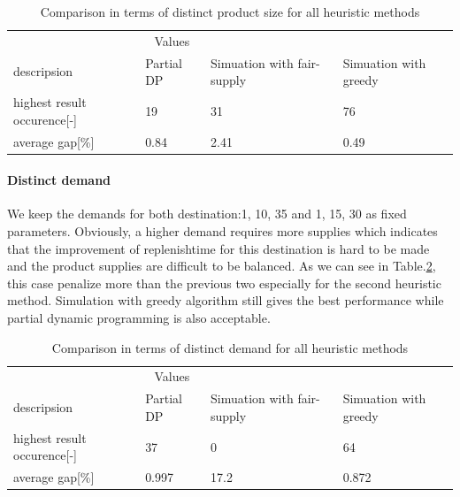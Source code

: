 \documentclass{article}
\begin{document}
\begin{table}[ht]
 \caption{Comparison in terms of distinct product size for all heuristic methods}
  \centering
  \begin{tabular}{llll}
    \toprule
    \multicolumn{3}{c}{Values}                   \\
    \cmidrule(r){2-3}
    descripsion   & Partial DP    & Simuation with fair-supply      & Simuation with greedy \\
    \midrule
    highest result occurence[-]	&	19 	&	31 	&	76	\\
    average gap[\%]	&	0.84	&	2.41 	&	0.49 	\\
    \bottomrule
  \end{tabular}
  \label{tab:distinct product size for heu}
\end{table}

\paragraph{Distinct demand}
We keep the demands for both destination:1, 10, 35 and 1, 15, 30 as fixed parameters. Obviously, a higher demand requires more supplies which indicates that the improvement of replenishtime for this destination is hard to be made and the product supplies are difficult to be balanced. As we can see in Table.\ref{tab:distinct demand for heu}, this case penalize more than the previous two especially for the second heuristic method. Simulation with greedy algorithm still gives the best performance while partial dynamic programming is also acceptable.

\begin{table}[ht]
 \caption{Comparison in terms of distinct demand for all heuristic methods}
  \centering
  \begin{tabular}{llll}
    \toprule
    \multicolumn{3}{c}{Values}                   \\
    \cmidrule(r){2-3}
    descripsion   & Partial DP    & Simuation with fair-supply      & Simuation with greedy \\
    \midrule
    highest result occurence[-]	&	37 	&	0	&	64	\\
    average gap[\%]	&	0.997	&	17.2 	&	0.872 	\\
    \bottomrule
  \end{tabular}
  \label{tab:distinct demand for heu}
\end{table}
\end{document}
